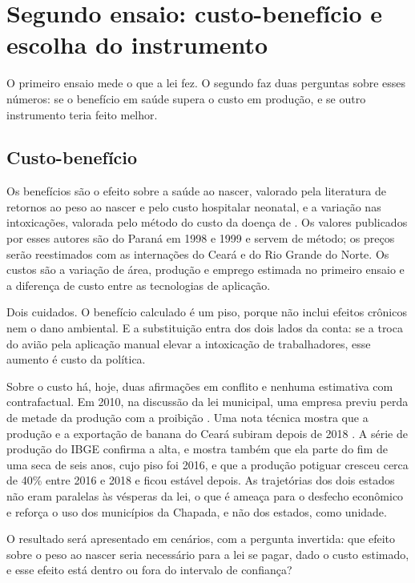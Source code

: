 \chapter{Segundo ensaio: custo-benefício e escolha do instrumento}
\label{sec:cb}

O primeiro ensaio mede o que a lei fez. O segundo faz duas perguntas sobre
esses números: se o benefício em saúde supera o custo em produção, e se outro
instrumento teria feito melhor.

\section{Custo-benefício}

Os benefícios são o efeito sobre a saúde ao nascer, valorado pela literatura de
retornos ao peso ao nascer e pelo custo hospitalar neonatal, e a variação nas
intoxicações, valorada pelo método do custo da doença de
. Os valores publicados por
esses autores são do Paraná em 1998 e 1999 e servem de método; os preços serão
reestimados com as internações do Ceará e do Rio Grande do Norte. Os custos são
a variação de área, produção e emprego estimada no primeiro ensaio e a
diferença de custo entre as tecnologias de aplicação.

Dois cuidados. O benefício calculado é um piso, porque não inclui efeitos
crônicos nem o dano ambiental. E a substituição entra dos dois lados da conta:
se a troca do avião pela aplicação manual elevar a intoxicação de
trabalhadores, esse aumento é custo da política.

Sobre o custo há, hoje, duas afirmações em conflito e nenhuma estimativa com
contrafactual. Em 2010, na discussão da lei municipal, uma empresa previu perda
de metade da produção com a proibição \cite[p.~169]{marinho2011dimensao}. Uma
nota técnica mostra que a produção e a exportação de banana do Ceará subiram
depois de 2018 \cite{cavalcante2022nota}. A série de produção do IBGE confirma
a alta, e mostra também que ela parte do fim de uma seca de seis anos, cujo
piso foi 2016, e que a produção potiguar cresceu cerca de 40\% entre 2016 e
2018 e ficou estável depois. As trajetórias dos dois estados não eram paralelas
às vésperas da lei, o que é ameaça para o desfecho econômico e reforça o uso
dos municípios da Chapada, e não dos estados, como unidade.

O resultado será apresentado em cenários, com a pergunta invertida: que efeito
sobre o peso ao nascer seria necessário para a lei se pagar, dado o custo
estimado, e esse efeito está dentro ou fora do intervalo de confiança?

